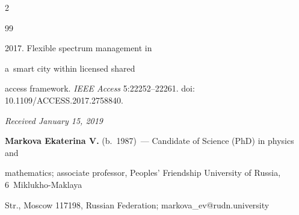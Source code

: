 \begin{multicols}{2}
{{\begin{thebibliography}{99}


 2017. Flexible spectrum management in 


a~smart city within licensed shared 


access framework. \textit{IEEE Access} 5:22252--22261. doi: 10.1109/ACCESS.2017.2758840.


\end{thebibliography}





 }


 }





\end{multicols}





\vspace*{-6pt}





\hfill{\small\textit{Received January 15, 2019}}










\vspace*{-12pt}








\Contr





\noindent


\textbf{Markova Ekaterina V.} (b.\ 1987)~--- Candidate of Science (PhD) in physics and 


mathematics; associate professor, Peoples' Friendship University of Russia, 6~Miklukho-Maklaya 


Str., Moscow 117198, Russian Federation; \mbox{markova\_ev@rudn.university} 










\noindent


